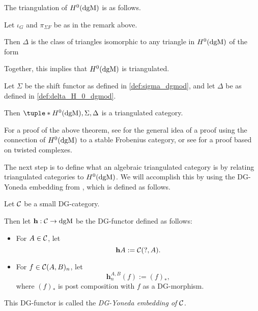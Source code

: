 The triangulation of \( H^0(\operatorname{dgM}) \) is as follows.
\begin{definition}
    \label{def:delta_H_0_dgmod}
    Let \( \iota_G \) and \( \pi_{\Sigma F} \) be as in the remark above.

    Then \( \Delta \) is the class of triangles isomorphic to any triangle in \( H^0(\operatorname{dgM}) \) of the form
    \begin{center}
    \end{center}
\end{definition}

Together, this implies that \( H^0(\operatorname{dgM}) \) is triangulated.
\begin{theorem}
    Let \( \Sigma \) be the shift functor as defined in \autoref{def:sigma_dgmod}, and let \( \Delta \) be as defined in \autoref{def:delta_H_0_dgmod}.

    Then \( \tuple*{H^0(\dgM), \Sigma, \Delta} \) is a triangulated category.
\end{theorem}
For a proof of the above theorem, see \cite[p.\ 31]{Jasso-Muro_2023} for the general idea of a proof using the connection of \( H^0(\operatorname{dgM}) \) to a stable Frobenius category, or see \cite[p.\ 97]{Bondal--Kapranov_1991} for a proof based on twisted complexes.

The next step is to define what an algebraic triangulated category is by relating triangulated categories to \( H^0(\operatorname{dgM}) \). We will accomplish this by using the DG-Yoneda embedding from \cite[Corollary 6.3.6]{Borceux_1994}, which is defined as follows.
\begin{definition}
    \label{def:DG_Yoneda_embedding}
    Let \( {\mathcal{C}} \) be a small DG-category.
    
    Then let \( \mathbf{h}: {\mathcal{C}} \to \operatorname{dgM} \) be the DG-functor defined as follows:
    \begin{itemize}
        \item {
            For \( A \in {\mathcal{C}} \), let
            \[
                \mathbf{h} A := {\mathcal{C}}(?, A).
            \]
        }
        \item {
            For \( f \in {\mathcal{C}}(A, B)_n \), let
            \[
                \mathbf{h}_n^{A, B} (f) := (f)_*,
            \]
            where \( (f)_* \) is post composition with \( f \) as a DG-morphism.
        }
    \end{itemize}

    This DG-functor is called the \emph{DG-Yoneda embedding of \( {\mathcal{C}} \)}.
\end{definition}

